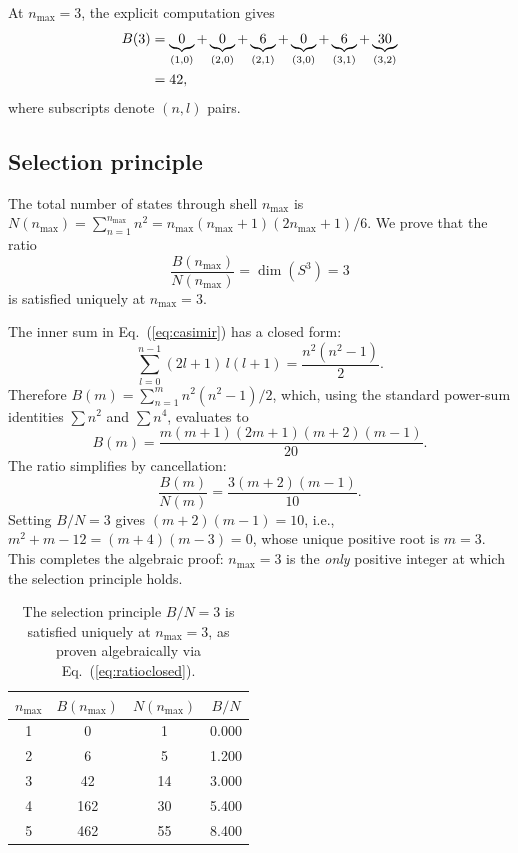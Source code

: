 \documentclass[aps,prl,twocolumn,superscriptaddress]{revtex4-2}
\begin{document}
At $n_{\max} = 3$, the explicit computation gives
\begin{align}
  B(3) &= \underbrace{0}_{(1,0)}
         + \underbrace{0}_{(2,0)} + \underbrace{6}_{(2,1)}
         + \underbrace{0}_{(3,0)} + \underbrace{6}_{(3,1)}
         + \underbrace{30}_{(3,2)} \notag \\
       &= 42,
\end{align}
where subscripts denote $(n, l)$ pairs.


\subsection{Selection principle}

The total number of states through shell $n_{\max}$ is
$N(n_{\max}) = \sum_{n=1}^{n_{\max}} n^2 = n_{\max}(n_{\max}+1)(2n_{\max}+1)/6$.
We prove that the ratio
\begin{equation}\label{eq:selection}
  \frac{B(n_{\max})}{N(n_{\max})} = \dim(S^3) = 3
\end{equation}
is satisfied uniquely at $n_{\max} = 3$.

The inner sum in Eq.~(\ref{eq:casimir}) has a closed form:
\begin{equation}\label{eq:innersum}
  \sum_{l=0}^{n-1}(2l+1)\,l(l+1) = \frac{n^2(n^2-1)}{2}.
\end{equation}
Therefore $B(m) = \sum_{n=1}^{m} n^2(n^2-1)/2$, which, using the
standard power-sum identities $\sum n^2$ and $\sum n^4$, evaluates to
\begin{equation}\label{eq:Bclosed}
  B(m) = \frac{m(m+1)(2m+1)(m+2)(m-1)}{20}.
\end{equation}
The ratio simplifies by cancellation:
\begin{equation}\label{eq:ratioclosed}
  \frac{B(m)}{N(m)} = \frac{3(m+2)(m-1)}{10}.
\end{equation}
Setting $B/N = 3$ gives $(m+2)(m-1) = 10$, i.e.,
$m^2 + m - 12 = (m+4)(m-3) = 0$,
whose unique positive root is $m = 3$. This completes the algebraic
proof: $n_{\max} = 3$ is the \textit{only} positive integer at which
the selection principle holds.

\begin{table}[h]
\centering
\begin{tabular}{cccc}
\hline\hline
$n_{\max}$ & $B(n_{\max})$ & $N(n_{\max})$ & $B/N$ \\
\hline
1 & 0   & 1  & 0.000 \\
2 & 6   & 5  & 1.200 \\
3 & 42  & 14 & 3.000 \\
4 & 162 & 30 & 5.400 \\
5 & 462 & 55 & 8.400 \\
\hline\hline
\end{tabular}
\caption{The selection principle $B/N = 3$ is satisfied uniquely at
$n_{\max} = 3$, as proven algebraically via
Eq.~(\ref{eq:ratioclosed}).}
\label{tab:selection}
\end{table}
\end{document}
